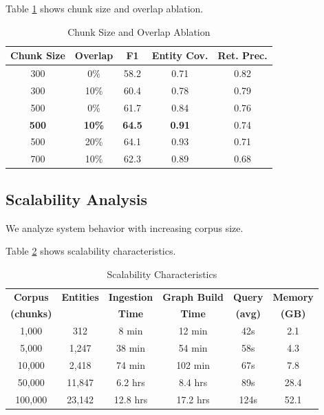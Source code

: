 \documentclass[conference]{IEEEtran}
\begin{document}
Table \ref{tab:chunkablation} shows chunk size and overlap ablation.

\begin{table}[htbp]
\caption{Chunk Size and Overlap Ablation}
\label{tab:chunkablation}
\centering
\begin{tabular}{ccccc}
\toprule
\textbf{Chunk Size} & \textbf{Overlap} & \textbf{F1} & \textbf{Entity Cov.} & \textbf{Ret. Prec.} \\
\midrule
300 & 0\% & 58.2 & 0.71 & 0.82 \\
300 & 10\% & 60.4 & 0.78 & 0.79 \\
500 & 0\% & 61.7 & 0.84 & 0.76 \\
\textbf{500} & \textbf{10\%} & \textbf{64.5} & \textbf{0.91} & 0.74 \\
500 & 20\% & 64.1 & 0.93 & 0.71 \\
700 & 10\% & 62.3 & 0.89 & 0.68 \\
\bottomrule
\end{tabular}
\end{table}

\subsection{Scalability Analysis}

We analyze system behavior with increasing corpus size.

Table \ref{tab:scalability} shows scalability characteristics.

\begin{table}[htbp]
\caption{Scalability Characteristics}
\label{tab:scalability}
\centering
\footnotesize
\begin{tabular}{cccccc}
\toprule
\textbf{Corpus} & \textbf{Entities} & \textbf{Ingestion} & \textbf{Graph Build} & \textbf{Query} & \textbf{Memory} \\
\textbf{(chunks)} & & \textbf{Time} & \textbf{Time} & \textbf{(avg)} & \textbf{(GB)} \\
\midrule
1,000 & 312 & 8 min & 12 min & 42s & 2.1 \\
5,000 & 1,247 & 38 min & 54 min & 58s & 4.3 \\
10,000 & 2,418 & 74 min & 102 min & 67s & 7.8 \\
50,000 & 11,847 & 6.2 hrs & 8.4 hrs & 89s & 28.4 \\
100,000 & 23,142 & 12.8 hrs & 17.2 hrs & 124s & 52.1 \\
\bottomrule
\end{tabular}
\end{table}
\end{document}
